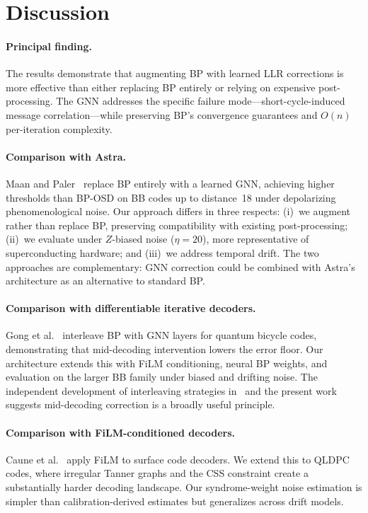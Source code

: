 \documentclass[a4paper,twocolumn,11pt,unpublished,nopdfoutputerror]{quantumarticle}
\begin{document}
\section{Discussion}\label{sec:discussion}

\paragraph{Principal finding.}
The results demonstrate that augmenting BP with learned LLR corrections is more effective than either replacing BP entirely or relying on expensive post-processing. The GNN addresses the specific failure mode---short-cycle-induced message correlation---while preserving BP's convergence guarantees and $O(n)$ per-iteration complexity.

\paragraph{Comparison with Astra.}
Maan and Paler~\cite{Maan2025MLBP} replace BP entirely with a learned GNN, achieving higher thresholds than BP-OSD on BB codes up to distance~18 under depolarizing phenomenological noise. Our approach differs in three respects: (i)~we augment rather than replace BP, preserving compatibility with existing post-processing; (ii)~we evaluate under $Z$-biased noise ($\eta = 20$), more representative of superconducting hardware; and (iii)~we address temporal drift. The two approaches are complementary: GNN correction could be combined with Astra's architecture as an alternative to standard BP.

\paragraph{Comparison with differentiable iterative decoders.}
Gong et al.~\cite{Gong2024GNN} interleave BP with GNN layers for quantum bicycle codes, demonstrating that mid-decoding intervention lowers the error floor. Our architecture extends this with FiLM conditioning, neural BP weights, and evaluation on the larger BB family under biased and drifting noise. The independent development of interleaving strategies in~\cite{Gong2024GNN} and the present work suggests mid-decoding correction is a broadly useful principle.

\paragraph{Comparison with FiLM-conditioned decoders.}
Caune et al.~\cite{Caune2025FiLM} apply FiLM to surface code decoders. We extend this to QLDPC codes, where irregular Tanner graphs and the CSS constraint create a substantially harder decoding landscape. Our syndrome-weight noise estimation is simpler than calibration-derived estimates but generalizes across drift models.
\end{document}

